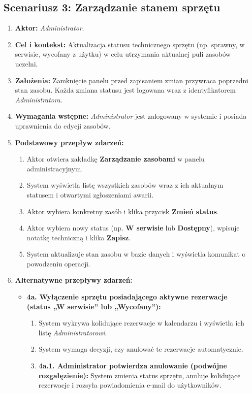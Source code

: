 \documentclass[11pt, a4paper]{article}
\begin{document}
\subsection{Scenariusz 3: Zarządzanie stanem sprzętu}
\begin{enumerate}
    \item \textbf{Aktor:} \textit{Administrator}.
    \item \textbf{Cel i kontekst:} Aktualizacja statusu technicznego sprzętu (np. sprawny, w serwisie, wycofany z użytku) w celu utrzymania aktualnej puli zasobów uczelni.
    \item \textbf{Założenia:} Zamknięcie panelu przed zapisaniem zmian przywraca poprzedni stan zasobu. Każda zmiana statusu jest logowana wraz z identyfikatorem \textit{Administratora}.
    \item \textbf{Wymagania wstępne:} \textit{Administrator} jest zalogowany w systemie i posiada uprawnienia do edycji zasobów.
    \item \textbf{Podstawowy przepływ zdarzeń:}
    \begin{enumerate}
        \item Aktor otwiera zakładkę \textbf{Zarządzanie zasobami} w panelu administracyjnym.
        \item System wyświetla listę wszystkich zasobów wraz z ich aktualnym statusem i otwartymi zgłoszeniami awarii.
        \item Aktor wybiera konkretny zasób i klika przycisk \textbf{Zmień status}.
        \item Aktor wybiera nowy status (np. \textbf{W serwisie} lub \textbf{Dostępny}), wpisuje notatkę techniczną i klika \textbf{Zapisz}.
        \item System aktualizuje stan zasobu w bazie danych i wyświetla komunikat o powodzeniu operacji.
    \end{enumerate}
    \item \textbf{Alternatywne przepływy zdarzeń:}
    \begin{itemize}
        \item \textbf{4a. Wyłączenie sprzętu posiadającego aktywne rezerwacje (status „W serwisie” lub „Wycofany”):}
        \begin{enumerate}
            \item System wykrywa kolidujące rezerwacje w kalendarzu i wyświetla ich listę \textit{Administratorowi}.
            \item System wymaga decyzji, czy anulować te rezerwacje automatycznie.
            \item \textbf{4a.1. Administrator potwierdza anulowanie (podwójne rozgałęzienie):} System zmienia status sprzętu, anuluje kolidujące rezerwacje i rozsyła powiadomienia e-mail do użytkowników.

\end{enumerate}
\end{itemize}
\end{enumerate}
\end{document}
